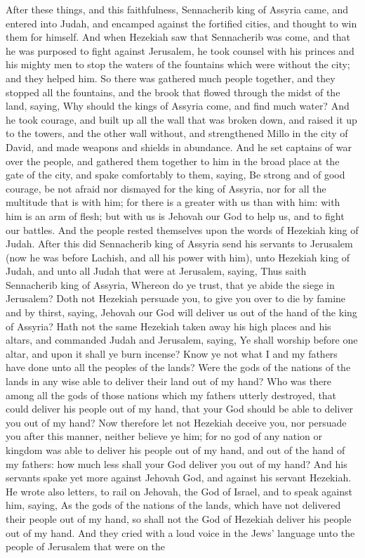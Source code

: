 After these things, and this faithfulness, Sennacherib king of Assyria came, and entered into Judah, and encamped against the fortified cities, and thought to win them for himself. And when Hezekiah saw that Sennacherib was come, and that he was purposed to fight against Jerusalem, he took counsel with his princes and his mighty men to stop the waters of the fountains which were without the city; and they helped him. So there was gathered much people together, and they stopped all the fountains, and the brook that flowed through the midst of the land, saying, Why should the kings of Assyria come, and find much water? And he took courage, and built up all the wall that was broken down, and raised it up to the towers, and the other wall without, and strengthened Millo in the city of David, and made weapons and shields in abundance. And he set captains of war over the people, and gathered them together to him in the broad place at the gate of the city, and spake comfortably to them, saying, Be strong and of good courage, be not afraid nor dismayed for the king of Assyria, nor for all the multitude that is with him; for there is a greater with us than with him: with him is an arm of flesh; but with us is Jehovah our God to help us, and to fight our battles. And the people rested themselves upon the words of Hezekiah king of Judah.  After this did Sennacherib king of Assyria send his servants to Jerusalem (now he was before Lachish, and all his power with him), unto Hezekiah king of Judah, and unto all Judah that were at Jerusalem, saying, Thus saith Sennacherib king of Assyria, Whereon do ye trust, that ye abide the siege in Jerusalem? Doth not Hezekiah persuade you, to give you over to die by famine and by thirst, saying, Jehovah our God will deliver us out of the hand of the king of Assyria? Hath not the same Hezekiah taken away his high places and his altars, and commanded Judah and Jerusalem, saying, Ye shall worship before one altar, and upon it shall ye burn incense? Know ye not what I and my fathers have done unto all the peoples of the lands? Were the gods of the nations of the lands in any wise able to deliver their land out of my hand? Who was there among all the gods of those nations which my fathers utterly destroyed, that could deliver his people out of my hand, that your God should be able to deliver you out of my hand? Now therefore let not Hezekiah deceive you, nor persuade you after this manner, neither believe ye him; for no god of any nation or kingdom was able to deliver his people out of my hand, and out of the hand of my fathers: how much less shall your God deliver you out of my hand?  And his servants spake yet more against Jehovah God, and against his servant Hezekiah. He wrote also letters, to rail on Jehovah, the God of Israel, and to speak against him, saying, As the gods of the nations of the lands, which have not delivered their people out of my hand, so shall not the God of Hezekiah deliver his people out of my hand. And they cried with a loud voice in the Jews’ language unto the people of Jerusalem that were on the 